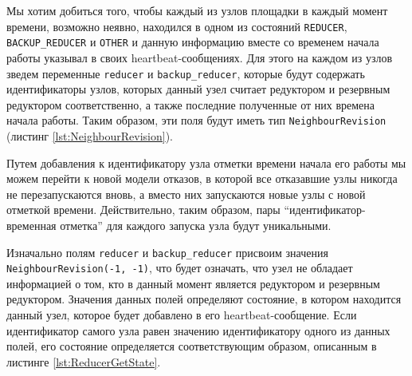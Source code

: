 \documentclass{article}
\theoremstyle{plain}
\theoremstyle{plain}
\theoremstyle{plain}
\theoremstyle{plain}
\theoremstyle{definition}
\theoremstyle{remark}
\theoremstyle{plain}
\begin{document}
Мы хотим добиться того, чтобы каждый из узлов площадки в каждый момент времени, возможно неявно, находился в одном из состояний \texttt{REDUCER}, \texttt{BACKUP\_REDUCER} и \texttt{OTHER} и данную информацию вместе со временем начала работы указывал в своих heartbeat-сообщениях. Для этого на каждом из узлов зведем переменные \texttt{reducer} и \texttt{backup\_reducer}, которые будут содержать идентификаторы узлов, которых данный узел считает редуктором и резервным редуктором соответственно, а также последние полученные от них времена начала работы. Таким образом, эти поля будут иметь тип \texttt{NeighbourRevision} (листинг \ref{lst:NeighbourRevision}).


Путем добавления к идентификатору узла отметки времени начала его работы мы можем перейти к новой модели отказов, в которой все отказавшие узлы никогда не перезапускаются вновь, а вместо них запускаются новые узлы с новой отметкой времени. Действительно, таким образом, пары \enquote{идентификатор-временная отметка} для каждого запуска узла будут уникальными.

Изначально полям \texttt{reducer} и \texttt{backup\_reducer} присвоим значения \texttt{Neigh\-bour\-Re\-vi\-si\-on(-1, -1)}, что будет означать, что узел не обладает информацией о том, кто в данный момент является редуктором и резервным редуктором. Значения данных полей определяют состояние, в котором находится данный узел, которое будет добавлено в его heartbeat-сообщение. Если идентификатор самого узла равен значению идентификатору одного из данных полей, его состояние определяется соответствующим образом, описанным в листинге \ref{lst:ReducerGetState}.

\end{document}
